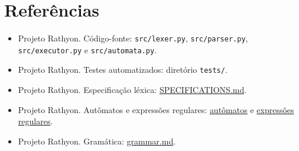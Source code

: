 \documentclass[12pt,a4paper]{article}
\begin{document}
\section{Referências}

\begin{itemize}
    \item Projeto Rathyon. Código-fonte: \texttt{src/lexer.py}, \texttt{src/parser.py}, \texttt{src/executor.py} e \texttt{src/automata.py}.
    \item Projeto Rathyon. Testes automatizados: diretório \texttt{tests/}.
    \item Projeto Rathyon. Especificação léxica: \href{../markdown/SPECIFICATIONS.md}{SPECIFICATIONS.md}.
    \item Projeto Rathyon. Autômatos e expressões regulares: \href{../markdown/AUTOMATA.md}{autômatos} e \href{../markdown/REGULAR_EXPRESSIONS.md}{expressões regulares}.
    \item Projeto Rathyon. Gramática: \href{../markdown/grammar.md}{grammar.md}.
\end{itemize}
\end{document}
